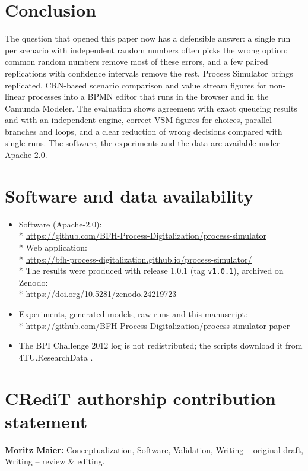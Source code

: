 \documentclass[preprint,12pt,nonatbib]{elsarticle}
\newcommand{\tool}{Process Simulator}
\begin{document}
\section{Conclusion}
\label{sec:conclusion}
The question that opened this paper now has a defensible answer: a single run per scenario with independent random numbers often picks the wrong option; common random numbers remove most of these errors, and a few paired replications with confidence intervals remove the rest. \tool{} brings replicated, CRN-based scenario comparison and value stream figures for non-linear processes into a BPMN editor that runs in the browser and in the Camunda Modeler. The evaluation shows agreement with exact queueing results and with an independent engine, correct VSM figures for choices, parallel branches and loops, and a clear reduction of wrong decisions compared with single runs. The software, the experiments and the data are available under Apache-2.0.

\section*{Software and data availability}
\begin{itemize}\raggedright
\item Software (Apache-2.0):\\* \url{https://github.com/BFH-Process-Digitalization/process-simulator}\\* Web application:\\* \url{https://bfh-process-digitalization.github.io/process-simulator/}\\* The results were produced with release 1.0.1 (tag \texttt{v1.0.1}), archived on Zenodo:\\* \url{https://doi.org/10.5281/zenodo.24219723}
\item Experiments, generated models, raw runs and this manuscript:\\* \url{https://github.com/BFH-Process-Digitalization/process-simulator-paper}
\item The BPI Challenge 2012 log is not redistributed; the scripts download it from 4TU.ResearchData \citep{bpic2012}.
\end{itemize}

\section*{CRediT authorship contribution statement}
\textbf{Moritz Maier:} Conceptualization, Software, Validation, Writing -- original draft, Writing -- review \& editing.
\end{document}
